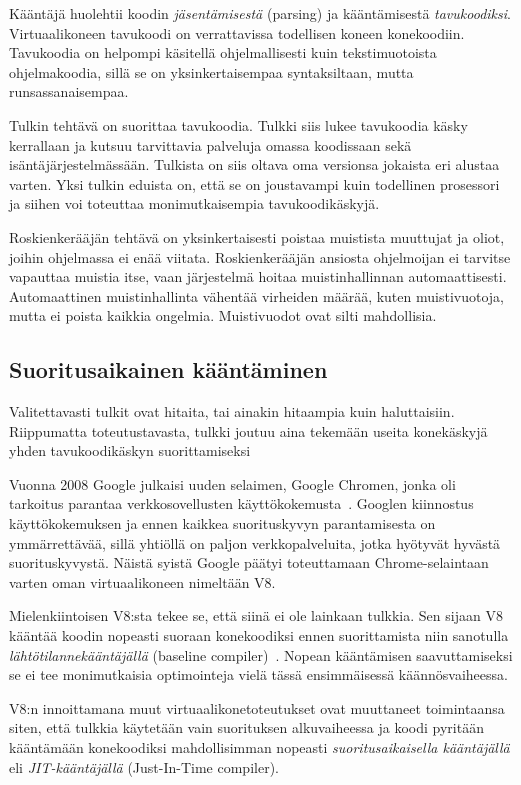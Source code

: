 Kääntäjä huolehtii koodin \textit{jäsentämisestä} (parsing) ja kääntämisestä \textit{tavukoodiksi}. Virtuaalikoneen tavukoodi on verrattavissa todellisen koneen konekoodiin. Tavukoodia on helpompi käsitellä ohjelmallisesti kuin tekstimuotoista ohjelmakoodia, sillä se on yksinkertaisempaa syntaksiltaan, mutta runsassanaisempaa.

Tulkin tehtävä on suorittaa tavukoodia. Tulkki siis lukee tavukoodia käsky kerrallaan ja kutsuu tarvittavia palveluja omassa koodissaan sekä isäntäjärjestelmässään. Tulkista on siis oltava oma versionsa jokaista eri alustaa varten. Yksi tulkin eduista on, että se on joustavampi kuin todellinen prosessori ja siihen voi toteuttaa monimutkaisempia tavukoodikäskyjä.

Roskienkerääjän tehtävä on yksinkertaisesti poistaa muistista muuttujat ja oliot, joihin ohjelmassa ei enää viitata. Roskienkerääjän ansiosta ohjelmoijan ei tarvitse vapauttaa muistia itse, vaan järjestelmä hoitaa muistinhallinnan automaattisesti. Automaattinen muistinhallinta vähentää virheiden määrää, kuten muistivuotoja, mutta ei poista kaikkia ongelmia. Muistivuodot ovat silti mahdollisia.

\subsection{Suoritusaikainen kääntäminen}

Valitettavasti tulkit ovat hitaita, tai ainakin hitaampia kuin haluttaisiin. Riippumatta toteutustavasta, tulkki joutuu aina tekemään useita konekäskyjä yhden tavukoodikäskyn suorittamiseksi~\cite[s.~35]{vms}

Vuonna 2008 Google julkaisi uuden selaimen, Google Chromen, jonka oli tarkoitus parantaa verkkosovellusten käyttökokemusta~\cite{chromepress}. Googlen kiinnostus käyttökokemuksen ja ennen kaikkea suorituskyvyn parantamisesta on ymmärrettävää, sillä yhtiöllä on paljon verkkopalveluita, jotka hyötyvät hyvästä suorituskyvystä. Näistä syistä Google päätyi toteuttamaan Chrome-selaintaan varten oman virtuaalikoneen nimeltään V8.

Mielenkiintoisen V8:sta tekee se, että siinä ei ole lainkaan tulkkia. Sen sijaan V8 kääntää koodin nopeasti suoraan konekoodiksi ennen suorittamista niin sanotulla \textit{lähtötilannekääntäjällä} (baseline compiler)~\cite{v8design}. Nopean kääntämisen saavuttamiseksi se ei tee monimutkaisia optimointeja vielä tässä ensimmäisessä käännösvaiheessa.

V8:n innoittamana muut virtuaalikonetoteutukset ovat muuttaneet toimintaansa siten, että tulkkia käytetään vain suorituksen alkuvaiheessa ja koodi pyritään kääntämään konekoodiksi mahdollisimman nopeasti \textit{suoritusaikaisella kääntäjällä} eli \textit{JIT-kääntäjällä} (Just-In-Time compiler).


